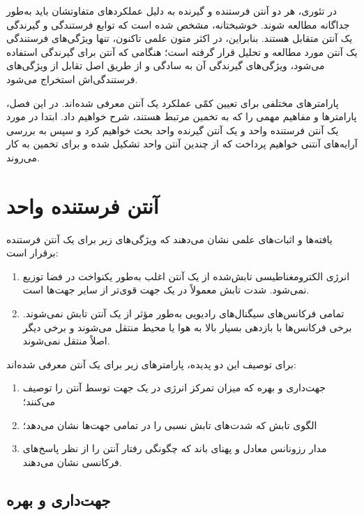در تئوری، هر دو آنتن فرستنده و گیرنده به دلیل عملکردهای متفاوتشان باید به‌طور جداگانه مطالعه شوند. خوشبختانه، مشخص شده است که توابع فرستندگی و گیرندگی یک آنتن متقابل هستند. بنابراین، در اکثر متون علمی تاکنون، تنها ویژگی‌های فرستندگی یک آنتن مورد مطالعه و تحلیل قرار گرفته است؛ هنگامی که آنتن برای گیرندگی استفاده می‌شود، ویژگی‌های گیرندگی آن به سادگی و از طریق اصل تقابل از ویژگی‌های فرستندگی‌اش استخراج می‌شود.

پارامترهای مختلفی برای تعیین کمّی عملکرد یک آنتن معرفی شده‌اند. در این فصل، پارامترها و مفاهیم مهمی را که به تخمین  مرتبط هستند، شرح خواهیم داد. ابتدا در مورد یک آنتن فرستنده واحد و یک آنتن گیرنده واحد بحث خواهیم کرد و سپس به بررسی آرایه‌های آنتنی خواهیم پرداخت که از چندین آنتن واحد تشکیل شده و برای تخمین  به کار می‌روند.




\section{آنتن فرستنده واحد}
\label{sec:2-1}

یافته‌ها و اثبات‌های علمی نشان می‌دهند که ویژگی‌های زیر برای یک آنتن فرستنده برقرار است:
\begin{enumerate}
	\item انرژی الکترومغناطیسی تابش‌شده از یک آنتن اغلب به‌طور یکنواخت در فضا توزیع نمی‌شود. شدت تابش معمولاً در یک جهت قوی‌تر از سایر جهت‌ها است.
	\item تمامی فرکانس‌های سیگنال‌های رادیویی به‌طور مؤثر از یک آنتن تابش نمی‌شوند. برخی فرکانس‌ها با بازدهی بسیار بالا به هوا یا محیط منتقل می‌شوند و برخی دیگر اصلاً منتقل نمی‌شوند.
\end{enumerate}

برای توصیف این دو پدیده، پارامترهای زیر برای یک آنتن معرفی شده‌اند:
\begin{enumerate}
	\item جهت‌داری و بهره که میزان تمرکز انرژی در یک جهت توسط آنتن را توصیف می‌کنند؛
	\item الگوی تابش که شدت‌های تابش نسبی را در تمامی جهت‌ها نشان می‌دهد؛
	\item مدار رزونانس معادل و پهنای باند که چگونگی رفتار آنتن را از نظر پاسخ‌های فرکانسی نشان می‌دهند.
\end{enumerate}

\subsection{جهت‌داری و بهره}
\label{subsec:2-1-1}

